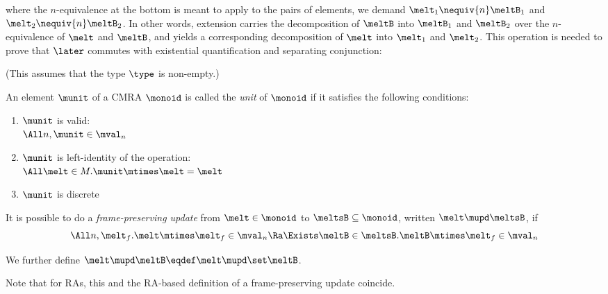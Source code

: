 \begin{center}
\end{center}
where the $n$-equivalence at the bottom is meant to apply to the pairs of elements, \ie we demand $\melt_1 \nequiv{n} \meltB_1$ and $\melt_2 \nequiv{n} \meltB_2$.
In other words, extension carries the decomposition of $\meltB$ into $\meltB_1$ and $\meltB_2$ over the $n$-equivalence of $\melt$ and $\meltB$, and yields a corresponding decomposition of $\melt$ into $\melt_1$ and $\melt_2$.
This operation is needed to prove that $\later$ commutes with existential quantification and separating conjunction:
(This assumes that the type $\type$ is non-empty.)

\begin{defn}
  An element $\munit$ of a CMRA $\monoid$ is called the \emph{unit} of $\monoid$ if it satisfies the following conditions:
  \begin{enumerate}[itemsep=0pt]
  \item $\munit$ is valid: \\ $\All n, \munit \in \mval_n$
  \item $\munit$ is left-identity of the operation: \\
    $\All \melt \in M. \munit \mtimes \melt = \melt$
  \item $\munit$ is discrete
  \end{enumerate}
\end{defn}

\begin{defn}
  It is possible to do a \emph{frame-preserving update} from $\melt \in \monoid$ to $\meltsB \subseteq \monoid$, written $\melt \mupd \meltsB$, if
  \[ \All n, \melt_f. \melt \mtimes \melt_f \in \mval_n \Ra \Exists \meltB \in \meltsB. \meltB \mtimes \melt_f \in \mval_n \]

  We further define $\melt \mupd \meltB \eqdef \melt \mupd \set\meltB$.
\end{defn}
Note that for RAs, this and the RA-based definition of a frame-preserving update coincide.

